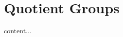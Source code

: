 \documentclass{book}
\begin{document}
	
	
	
	
	
	
	
	
	
	
	
	
	
	
	
	
	
	
	
	
	
	
	
	
	
	
	
	
	
	
	
	
	
	
	
	
	
	
	
	
	
	
	
	
	
	
	
	
	
	
	
	
	\section{Quotient Groups}
	
	\begin{defn}
		content...
	\end{defn}
	
	
	
	
	
	
	
	
	
	
	
	
	
	
	
	
	
	
	
	
	
	
	
	
	
	
	
	
	
	
	
	
	
	
	
	
	
	
	
	
	
	
	
	
	
	
	
	
	
	
	
\end{document}
